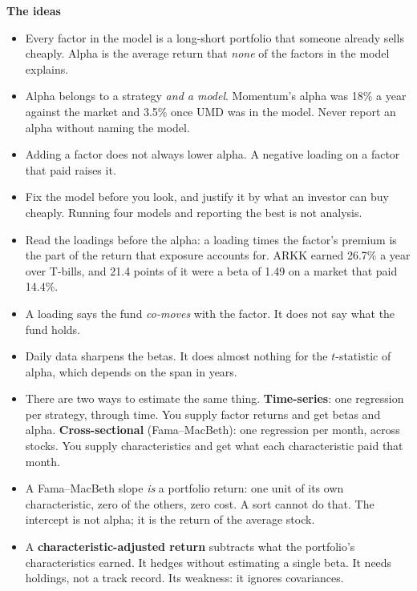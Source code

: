 \documentclass[11pt]{article}
\newcounter{ex}[section]
\newcommand{\head}[1]{\par\medskip\textbf{#1}\par}
\begin{document}
\head{The ideas}
\begin{itemize}
\item Every factor in the model is a long-short portfolio that someone already sells cheaply. Alpha is the average
return that \emph{none} of the factors in the model explains.
\item Alpha belongs to a strategy \emph{and a model}. Momentum's alpha was 18\% a year against the market and 3.5\% once
UMD was in the model. Never report an alpha without naming the model.
\item Adding a factor does not always lower alpha. A negative loading on a factor that paid raises it.
\item Fix the model before you look, and justify it by what an investor can buy cheaply. Running four models and
reporting the best is not analysis.
\item Read the loadings before the alpha: a loading times the factor's premium is the part of the return that exposure
accounts for. ARKK earned 26.7\% a year over T-bills, and 21.4 points of it were a beta of 1.49 on a market that paid
14.4\%.
\item A loading says the fund \emph{co-moves} with the factor. It does not say what the fund holds.
\item Daily data sharpens the betas. It does almost nothing for the $t$-statistic of alpha, which depends on the span in
years.
\item There are two ways to estimate the same thing. \textbf{Time-series}: one regression per strategy, through time.
You supply factor returns and get betas and alpha. \textbf{Cross-sectional} (Fama--MacBeth): one regression per month,
across stocks. You supply characteristics and get what each characteristic paid that month.
\item A Fama--MacBeth slope \emph{is} a portfolio return: one unit of its own characteristic, zero of the others, zero
cost. A sort cannot do that. The intercept is not alpha; it is the return of the average stock.
\item A \textbf{characteristic-adjusted return} subtracts what the portfolio's characteristics earned. It hedges without
estimating a single beta. It needs holdings, not a track record. Its weakness: it ignores covariances.
\end{itemize}
\end{document}
